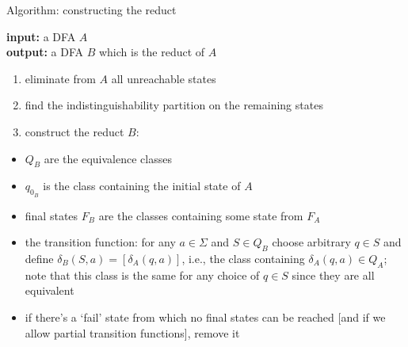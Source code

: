 \documentclass[handout]{beamer}
\begin{document}
\begin{frame}{Algorithm: constructing the reduct}
    
    \textbf{input:} a DFA $A$\\
    \textbf{output:} a DFA $B$ which is the reduct of $A$

    \begin{enumerate}
        \item eliminate from $A$ all unreachable states
        \item find the indistinguishability partition on the remaining states
        \item construct the reduct $B$:
    \end{enumerate}
    \begin{itemize}
        \item $Q_B$ are the equivalence classes
        \item $q_{0_B}$ is the class containing the initial state of $A$
        \item final states $F_B$ are the classes containing some state from $F_A$
        \item the \alert{transition function}: for any $a\in\Sigma$ and $S\in Q_B$ choose arbitrary $q\in S$ and define \alert{$\delta_B(S,a)=[\delta_A(q,a)]$}, i.e., the class containing  $\delta_A(q,a)\in Q_A$; note that this class is the same for any choice of $q\in S$ since they are all equivalent
        \item if there's a `fail' state from which no final states can be reached [and if we allow partial transition functions], remove it
    \end{itemize}

\end{frame}
\end{document}

